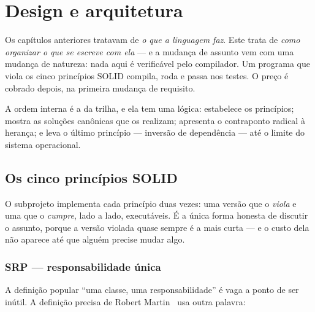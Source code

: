 
\section{Design e arquitetura}
\label{sec:design}

Os capítulos anteriores tratavam de \emph{o que a linguagem faz}. Este trata de
\emph{como organizar o que se escreve com ela} --- e a mudança de assunto vem
com uma mudança de natureza: nada aqui é verificável pelo compilador. Um
programa que viola os cinco princípios SOLID compila, roda e passa nos testes.
O preço é cobrado depois, na primeira mudança de requisito.

A ordem interna é a da trilha, e ela tem uma lógica:  estabelece
os princípios;  mostra as soluções canônicas que os
realizam;  apresenta o contraponto radical à herança; e
 leva o último princípio --- inversão de dependência
--- até o limite do sistema operacional.

\subsection{Os cinco princípios SOLID}
\label{sec:solid}

O subprojeto  implementa cada princípio duas vezes: uma versão
que o \emph{viola} e uma que o \emph{cumpre}, lado a lado, executáveis. É a
única forma honesta de discutir o assunto, porque a versão violada quase sempre
é a mais curta --- e o custo dela não aparece até que alguém precise mudar algo.

\subsubsection{SRP --- responsabilidade única}

A definição popular ``uma classe, uma responsabilidade'' é vaga a ponto de ser
inútil. A definição precisa de Robert Martin~\cite{martin2017} usa outra
palavra:

